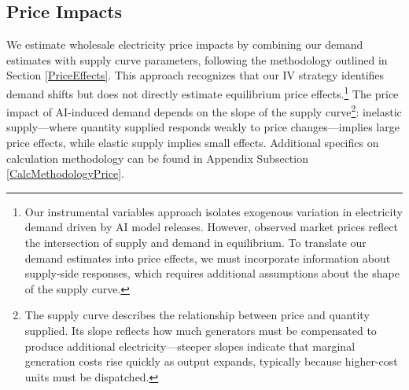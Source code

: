 \documentclass[a4paper,fleqn,longmktitle]{cas-sc}
\newcommand{\nb}[1]{\textcolor{blue}{NB[#1]}}
\begin{document}



\subsection{Price Impacts}


We estimate wholesale electricity price impacts by combining our demand estimates with supply curve parameters, following the methodology outlined in Section \ref{PriceEffects}. This approach recognizes that our IV strategy identifies demand shifts but does not directly estimate equilibrium price effects.\footnote{Our instrumental variables approach isolates exogenous variation in electricity demand driven by AI model releases. However, observed market prices reflect the intersection of supply and demand in equilibrium. To translate our demand estimates into price effects, we must incorporate information about supply-side responses, which requires additional assumptions about the shape of the supply curve.} The price impact of AI-induced demand depends on the slope of the supply curve\footnote{The supply curve describes the relationship between price and quantity supplied. Its slope reflects how much generators must be compensated to produce additional electricity—steeper slopes indicate that marginal generation costs rise quickly as output expands, typically because higher-cost units must be dispatched.}: inelastic supply—where quantity supplied responds weakly to price changes—implies large price effects, while elastic supply implies small effects. Additional specifics on calculation methodology can be found in Appendix Subsection \ref{CalcMethodologyPrice}.
\end{document}
